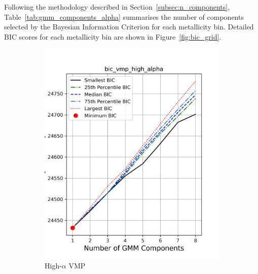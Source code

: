 \documentclass[a4paper,12pt]{article}
\begin{document}
Following the methodology described in Section~\ref{subsec:n_components}, Table~\ref{tab:gmm_components_alpha} summarises 
the number of components selected by the Bayesian Information Criterion for each metallicity bin.
Detailed BIC scores for each metallicity bin are shown in Figure~\ref{fig:bic_grid}.


\begin{figure}[htbp]
    \centering

    \begin{subfigure}[t]{0.24\textwidth}
        \includegraphics[width=\textwidth]{../figures/bic_vmp_high_alpha.png}
        \caption{High-$\alpha$ VMP}
    \end{subfigure}
    \begin{subfigure}[t]{0.24\textwidth}

\end{subfigure}
\end{figure}
\end{document}

